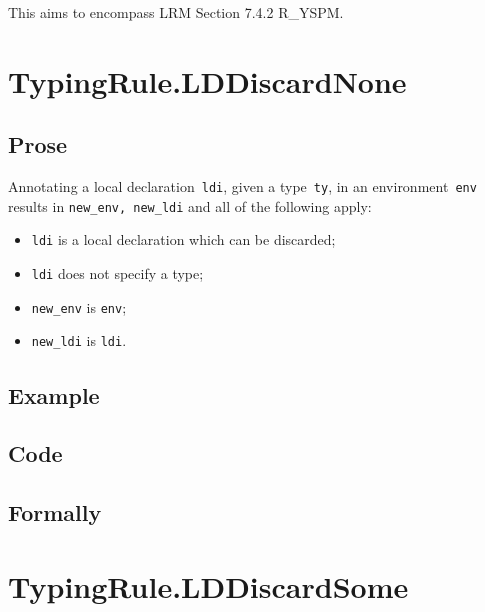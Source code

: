 \documentclass{book}
\begin{document}
This aims to encompass LRM Section 7.4.2 R\_YSPM.

\section{TypingRule.LDDiscardNone \label{sec:TypingRule.LDDiscardNone}}

  \subsection{Prose}
    Annotating a local declaration~\texttt{ldi}, given a type~\texttt{ty}, in
an environment~\texttt{env} results in \texttt{new\_env, new\_ldi} and all of
the following apply:
   \begin{itemize}
   \item \texttt{ldi} is a local declaration which can be discarded;
   \item \texttt{ldi} does not specify a type;
   \item \texttt{new\_env} is \texttt{env};
   \item \texttt{new\_ldi} is \texttt{ldi}.
   \end{itemize}

  \subsection{Example}

  \subsection{Code}

\begin{emptyformal}
    \subsection{Formally}
\end{emptyformal}


\section{TypingRule.LDDiscardSome \label{sec:TypingRule.LDDiscardSome}}
\end{document}
